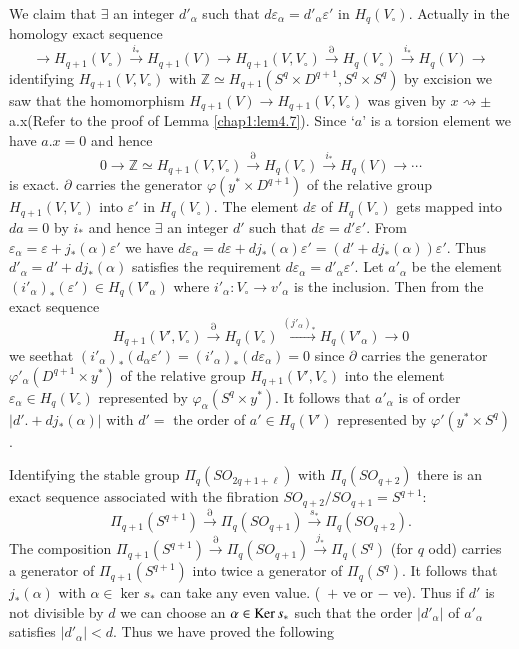 We claim that $ \exists$ an integer $d'_{\alpha}$  such that $ d
\varepsilon_\alpha = d' _\alpha \varepsilon'$ in $H_q(V_\circ)$. Actually
in the homology exact sequence  
$$ 
\to H_{q+1} (V_\circ) \xrightarrow{i_*} H_{q+1} (V) \to H_{q+1} (V, V_\circ)
\xrightarrow{\partial}H_q (V_\circ) \xrightarrow{i_*} H_{q} (V) \to 
$$
identifying $ H_{q+1}(V, V_\circ)$ with $ \mathbb{Z} \simeq H_{q+1}(S^q
\times D^{q+1}, S^q \times S^q)$ by excision we saw that the
homomorphism $ H_{q+1}(V) \to H_{q+1} (V,  V_\circ)$ was given by $x
\rightsquigarrow \pm$ a.x(Refer to the proof of Lemma \ref{chap1:lem4.7}). Since
`$a$' is a torsion element we have $a . x =0$ and hence  
$$
0 \to \mathbb{Z} \simeq H_{q+1} (V, V_\circ) \xrightarrow{\partial} H_q
(V_\circ) \xrightarrow{i_*} H_q (V) \to \cdots 
$$
is exact. $\partial$ carries the generator $ \varphi (y ^* \times
D^{q+1})$ of the relative group $ H_{q+1} (V, V_\circ)$ into $
\varepsilon'$ in $ H_q (V_\circ)$. The element $ d \varepsilon$ of $ H_q
(V_\circ)$ gets mapped into $ da = 0$ by $ i_*$ and hence $ \exists$ an
integer $ d'$ such that $ d \varepsilon = d' \varepsilon'$. From $
\varepsilon _\alpha = \varepsilon + j_* (\alpha ) \varepsilon'$ we
have $ d \varepsilon_\alpha = d \varepsilon + dj_* (\alpha )
\varepsilon' = (d' + dj_* (\alpha )) \varepsilon'$. Thus $ d'_\alpha =
d' + dj_* (\alpha)$ satisfies the requirement $ d \varepsilon_\alpha =
d'_\alpha \varepsilon'$. Let $ a'_\alpha$ be the element $
(i'_\alpha)_* (\varepsilon') \in H_q (V'_\alpha)$ where $
i'_\alpha : V_\circ \to v'_\alpha$ is the inclusion. Then from the exact
sequence  
$$
H_{q+1} (V', V_\circ) \xrightarrow{\partial} H_q (V_\circ)
\xrightarrow{(j'_\alpha)_*} H_q (V'_\alpha) \to  0 
$$
we see\pageoriginale that $ (i'_\alpha)_* (d _\alpha \varepsilon') =
(i'_\alpha)_* 
(d \varepsilon_\alpha) = 0$ since $ \partial $ carries the generator $
\varphi'_\alpha (D^{q+1} \times y^* )$ of the relative group $
H_{q+1}(V', V_\circ)$ into the element $\varepsilon_\alpha \in H_q
(V_\circ)$ represented by $ \varphi_\alpha (S^q \times y^*)$. It follows
that $ a' _\alpha$ is of order $|d'. + dj_* (\alpha )|$ with $d' = $
the order of $a' \in H_q (V')$ represented by $\varphi' (y^*
\times S^q)$. 

Identifying the stable group $ \Pi_q (SO_{2q+1 + \ell})$ with $\Pi_q
(SO_{q+2})$ there is an exact sequence associated with the fibration $
SO_{q+2} / SO_{q+1} = S^{q+1}$: 
$$
\Pi_{q+1} ( S^{q+1}) \xrightarrow{\partial} \Pi_q (SO_{q+1})
\xrightarrow{s_*} \Pi_q (SO_{q+2}). 
$$
The composition $ \Pi_{q+1} (S^{q+1}) \xrightarrow{\partial} \Pi_q
(SO_{q+1})  \xrightarrow{j_*} \Pi_q (S^q)$ (for $q$ odd) carries a
generator of $ \Pi_{q+1}(S^{q+1})$ into twice a generator of $
\Pi_q(S^q)$. It follows that $ j_* (\alpha)$ with $\alpha \in
\ker s_*$ can take any even value. (\, $+$ ve or $-$ ve). Thus if $d'$
is not divisible by $d$ we can choose an $\alpha \in \operatorname{Ker} s_*$
such that the order $ | d'_\alpha |$ of $ a'_\alpha$ satisfies
$|d'_\alpha | < d$. Thus we have proved the following  

